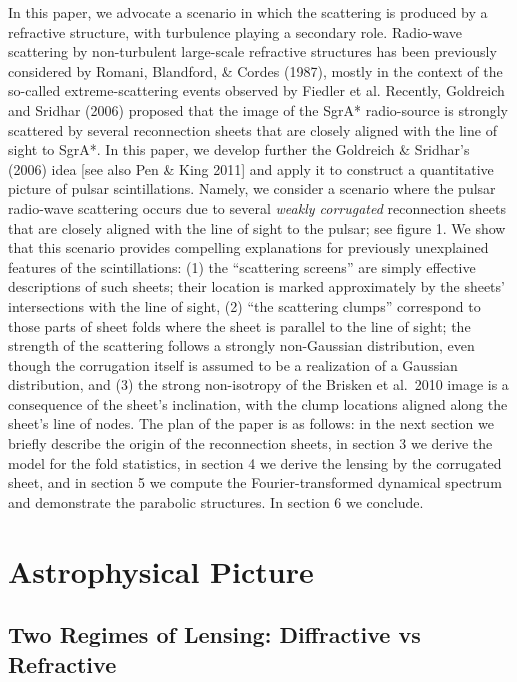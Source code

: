 \documentclass[useAMS,usenatbib]{mn2e}
\begin{document}
In this paper, we advocate a scenario in which the scattering is produced by a refractive structure, 
with turbulence playing a secondary role.
Radio-wave scattering by non-turbulent large-scale refractive structures has been previously
considered by Romani, Blandford, \& Cordes (1987), mostly in the context of the so-called
extreme-scattering events observed by Fiedler et al. Recently, Goldreich and Sridhar (2006) proposed that the image of the SgrA* radio-source is 
strongly scattered by several reconnection sheets that are closely aligned with the line of sight to
SgrA*.
In this paper, we develop further the Goldreich \& Sridhar's (2006) idea [see also Pen \& King 2011] 
and apply it to construct a quantitative
picture of pulsar scintillations. Namely, we consider a scenario where
the pulsar radio-wave scattering occurs due to several {\it weakly corrugated} 
reconnection sheets that are
closely aligned with the line of sight to the pulsar; see figure 1.  We show that this scenario provides
compelling explanations for previously unexplained features of the scintillations: 
(1)  the ``scattering screens'' are simply effective descriptions of such sheets; their location is marked 
approximately
by the sheets' intersections with the line of sight, (2) ``the scattering clumps'' correspond to 
those parts of sheet folds where the sheet is parallel 
to
the line of sight; the strength of the scattering follows a strongly non-Gaussian distribution, even though
the corrugation itself is assumed to be a realization of a Gaussian distribution, and (3) the
strong non-isotropy of the Brisken et al.~2010 image is a consequence of the sheet's inclination, 
with the clump locations aligned along the sheet's line of nodes. The plan of the paper is
as follows: in the next section we briefly describe the origin of the
reconnection sheets, in section 3  we derive the model for the fold statistics,
in section 4 we derive the lensing by the corrugated sheet, and in section 5 we compute the
Fourier-transformed dynamical spectrum and demonstrate the parabolic structures. In section 6 we conclude.



\section{Astrophysical Picture}

\subsection{Two Regimes of Lensing: Diffractive vs Refractive}
\end{document}
